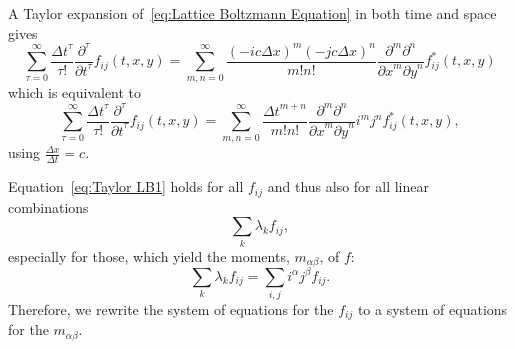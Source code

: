 \documentclass{article}
\begin{document}
A Taylor expansion of~\eqref{eq:Lattice Boltzmann Equation} in both time and space gives
\begin{equation*}
  \sum_{\tau = 0}^\infty \frac{{\Delta t}^\tau }{\tau!} \frac{\partial^\tau}{{\partial t}^\tau} f_{ij}(t, x, y) =
  \sum_{m,n = 0}^\infty \frac{{(-ic\Delta x)}^m{(-jc\Delta x)}^n} {m!n!} \frac{\partial^m \partial^n}{ {\partial x}^m{\partial y}^n} f^*_{ij}(t, x, y)
\end{equation*}
which is equivalent to
\begin{equation}
  \label{eq:Taylor LB1}
  \sum_{\tau = 0}^\infty \frac{{\Delta t}^\tau }{\tau!} \frac{\partial^\tau}{{\partial t}^\tau} f_{ij}(t, x, y) =
    \sum_{m,n = 0}^\infty \frac{{\Delta t}^{m+n}} {m!n!} \frac{\partial^m \partial^n}{ {\partial x}^m{\partial y}^n} i^m j^n f^*_{ij}(t, x, y),
\end{equation}
using $\frac{\Delta x} {\Delta{t}} = c$.

Equation~\eqref{eq:Taylor LB1} holds for all $f_{ij}$ and thus also for all linear combinations
\begin{equation*}
  \sum_{k}\lambda_k f_{ij},
\end{equation*}
especially for those, which yield the moments, $m_{\alpha\beta} $, of $f$:
\begin{equation*}
  \sum_{k}\lambda_k f_{ij} = \sum_{i,j}i^\alpha j^\beta f_{ij}.
\end{equation*}
Therefore, we rewrite the system of equations for the $f_{ij}$ to a system of equations for the $m_{\alpha\beta}$.
\end{document}
